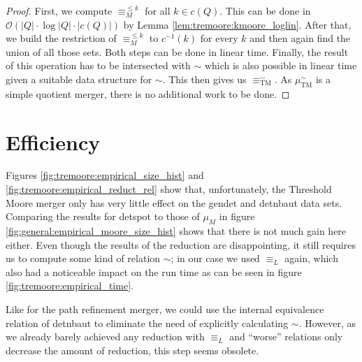 \begin{proof}
	First, we compute $\equiv_M^{\leq k}$ for all $k \in c(Q)$. This can be done in $\mathcal{O}(|Q| \cdot \log |Q| \cdot |c(Q)|)$ by Lemma \ref{lem:tremoore:kmoore_loglin}. After that, we build the restriction of $\equiv_M^{\leq k}$ to $c^{-1}(k)$ for every $k$ and then again find the union of all those sets. Both steps can be done in linear time. Finally, the result of this operation has to be intersected with $\sim$ which is also possible in linear time given a suitable data structure for $\sim$. This then gives us $\equiv_\text{TM}^\sim$. As $\mu_\text{TM}^\sim$ is a simple quotient merger, there is no additional work to be done.
\end{proof}



\section{Efficiency}
Figures \ref{fig:tremoore:empirical_size_hist} and \ref{fig:tremoore:empirical_reduct_rel} show that, unfortunately, the Threshold Moore merger only has very little effect on the \textsf{gendet} and \textsf{detnbaut} data sets. Comparing the results for \textsf{detspot} to those of $\mu_M$ in figure \ref{fig:general:empirical_moore_size_hist} shows that there is not much gain here either. Even though the results of the reduction are disappointing, it still requires us to compute some kind of relation $\sim$; in our case we used $\equiv_L$ again, which also had a noticeable impact on the run time as can be seen in figure \ref{fig:tremoore:empirical_time}.

Like for the path refinement merger, we could use the internal equivalence relation of \textsf{detnbaut} to eliminate the need of explicitly calculating $\sim$. However, as we already barely achieved any reduction with $\equiv_L$ and \enquote{worse} relations only decrease the amount of reduction, this step seems obsolete.


